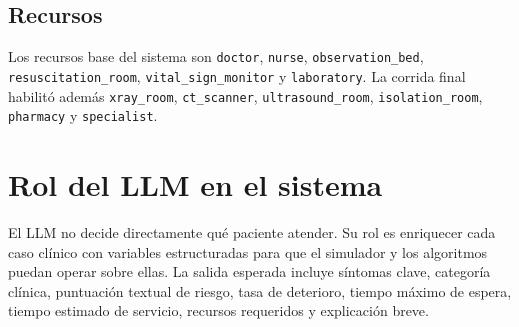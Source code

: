 \documentclass[12pt,a4paper]{article}
\begin{document}
\subsection{Recursos}

Los recursos base del sistema son \texttt{doctor}, \texttt{nurse}, \texttt{observation\_bed}, \texttt{resuscitation\_room}, \texttt{vital\_sign\_monitor} y \texttt{laboratory}. La corrida final habilitó además \texttt{xray\_room}, \texttt{ct\_scanner}, \texttt{ultrasound\_room}, \texttt{isolation\_room}, \texttt{pharmacy} y \texttt{specialist}.

\section{Rol del LLM en el sistema}

El LLM no decide directamente qué paciente atender. Su rol es enriquecer cada caso clínico con variables estructuradas para que el simulador y los algoritmos puedan operar sobre ellas. La salida esperada incluye síntomas clave, categoría clínica, puntuación textual de riesgo, tasa de deterioro, tiempo máximo de espera, tiempo estimado de servicio, recursos requeridos y explicación breve.

\begin{table}[H]
\centering
\begin{small}
%
\end{small}
\caption{Configuración de la corrida experimental final.}
\label{tab:config-final}
\end{table}
\end{document}
